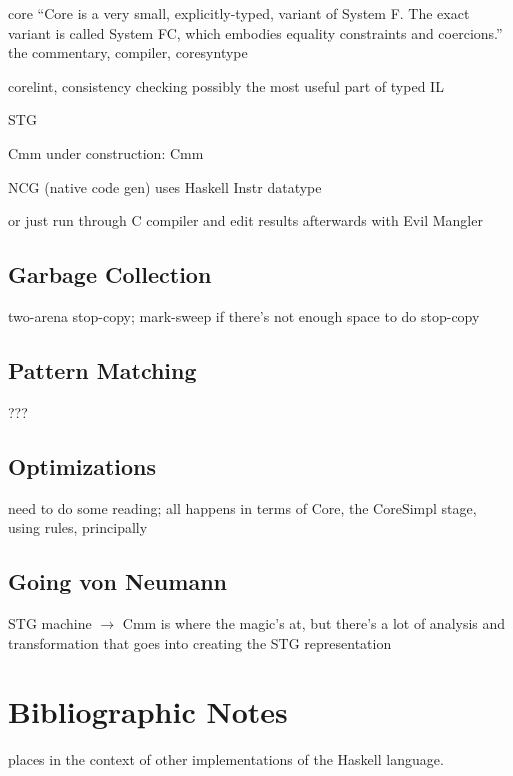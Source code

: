 core ``Core is a very small, explicitly-typed, variant of System F. The exact variant is called System FC, which embodies equality constraints and coercions.'' the commentary, compiler, coresyntype

corelint, consistency checking possibly the most useful part of typed IL

STG

Cmm
under construction: \CPS Cmm

NCG (native code gen) uses Haskell Instr datatype

or just run through C compiler and edit results afterwards with Evil Mangler

\subsection{Garbage Collection}
two-arena stop-copy; mark-sweep if there's not enough space to do stop-copy

\subsection{Pattern Matching}
???

\subsection{Optimizations}
need to do some reading; all happens in terms of Core, the CoreSimpl stage, using rules, principally

\subsection{Going von Neumann}
STG machine $\to$ Cmm is where the magic's at, but there's a lot of analysis and transformation that goes into creating the STG representation

\section{Bibliographic Notes}
 places \GHC in the context of other implementations of the Haskell language.
